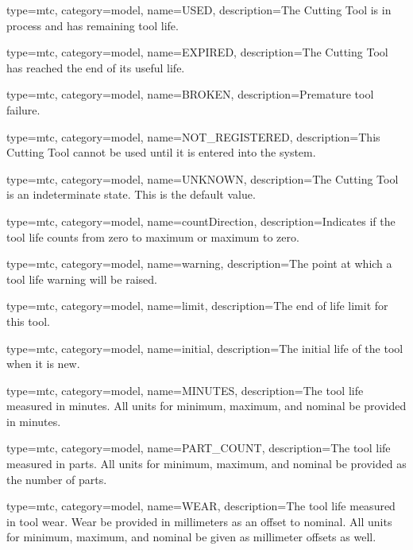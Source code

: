 {
  type=mtc,
  category=model,
  name={USED},
  description={The Cutting Tool is in process and has remaining tool life.}
}


{
  type=mtc,
  category=model,
  name={EXPIRED},
  description={The Cutting Tool has reached the end of its useful life.}
}


{
  type=mtc,
  category=model,
  name={BROKEN},
  description={Premature tool failure.}
}


{
  type=mtc,
  category=model,
  name={NOT\_REGISTERED},
  description={This Cutting Tool cannot be used until it is entered into the system.}
}


{
  type=mtc,
  category=model,
  name={UNKNOWN},
  description={The Cutting Tool is an indeterminate state. This is the default value.}
}


{
  type=mtc,
  category=model,
  name={countDirection},
  description={Indicates if the tool life counts from zero to maximum or maximum to zero.}
}


{
  type=mtc,
  category=model,
  name={warning},
  description={The point at which a tool life warning will be raised.}
}


{
  type=mtc,
  category=model,
  name={limit},
  description={The end of life limit for this tool.}
}


{
  type=mtc,
  category=model,
  name={initial},
  description={The initial life of the tool when it is new.}
}


{
  type=mtc,
  category=model,
  name={MINUTES},
  description={The tool life measured in minutes. All units for minimum, maximum, and nominal \MUST be provided in minutes.}
}


{
  type=mtc,
  category=model,
  name={PART\_COUNT},
  description={The tool life measured in parts. All units for minimum, maximum, and nominal \MUST be provided as the number of parts.}
}


{
  type=mtc,
  category=model,
  name={WEAR},
  description={The tool life measured in tool wear. Wear \MUST be provided in millimeters as an offset to nominal. All units for minimum, maximum, and nominal \MUST be given as millimeter offsets as well. }
}


